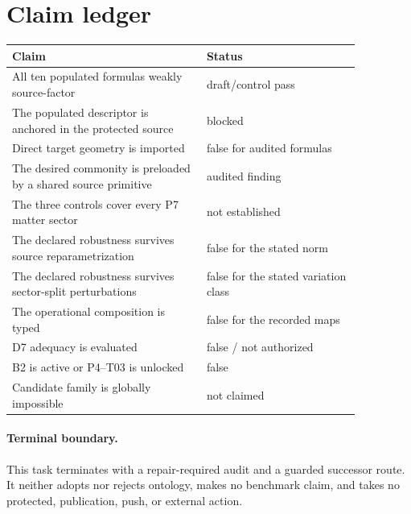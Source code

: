 \documentclass[11pt]{article}
\begin{document}
\section{Claim ledger}

\begin{center}
\begin{tabular}{>{\raggedright\arraybackslash}p{0.48\linewidth}
                >{\raggedright\arraybackslash}p{0.38\linewidth}}
\toprule
Claim & Status \\ \midrule
All ten populated formulas weakly source-factor & draft/control pass \\
The populated descriptor is anchored in the protected source & blocked \\
Direct target geometry is imported & false for audited formulas \\
The desired commonity is preloaded by a shared source primitive & audited finding \\
The three controls cover every P7 matter sector & not established \\
The declared robustness survives source reparametrization & false for the stated norm \\
The declared robustness survives sector-split perturbations & false for the stated variation class \\
The operational composition is typed & false for the recorded maps \\
D7 adequacy is evaluated & false / not authorized \\
B2 is active or P4--T03 is unlocked & false \\
Candidate family is globally impossible & not claimed \\
\bottomrule
\end{tabular}
\end{center}

\paragraph{Terminal boundary.}
This task terminates with a repair-required audit and a guarded successor
route.  It neither adopts nor rejects ontology, makes no benchmark claim, and
takes no protected, publication, push, or external action.
\end{document}
